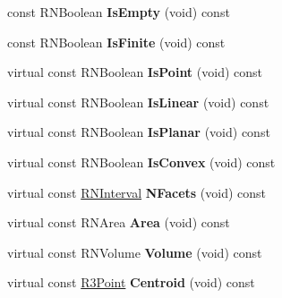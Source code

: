 \begin{DoxyCompactItemize}
\item 
const R\+N\+Boolean {\bfseries Is\+Empty} (void) const \hypertarget{class_r3_cylinder_a761d0c4aa5d83fc0affb7900b9805c8d}{}\label{class_r3_cylinder_a761d0c4aa5d83fc0affb7900b9805c8d}

\item 
const R\+N\+Boolean {\bfseries Is\+Finite} (void) const \hypertarget{class_r3_cylinder_a0280a087f4ffa522034a1ded3eeaad39}{}\label{class_r3_cylinder_a0280a087f4ffa522034a1ded3eeaad39}

\item 
virtual const R\+N\+Boolean {\bfseries Is\+Point} (void) const \hypertarget{class_r3_cylinder_a202a19364df59cbf2701c12f7ce8e13e}{}\label{class_r3_cylinder_a202a19364df59cbf2701c12f7ce8e13e}

\item 
virtual const R\+N\+Boolean {\bfseries Is\+Linear} (void) const \hypertarget{class_r3_cylinder_a05ee53382da321aa30bf2e61ccabbd49}{}\label{class_r3_cylinder_a05ee53382da321aa30bf2e61ccabbd49}

\item 
virtual const R\+N\+Boolean {\bfseries Is\+Planar} (void) const \hypertarget{class_r3_cylinder_a151f912edac18094583a02526a2198e6}{}\label{class_r3_cylinder_a151f912edac18094583a02526a2198e6}

\item 
virtual const R\+N\+Boolean {\bfseries Is\+Convex} (void) const \hypertarget{class_r3_cylinder_a15588c963e1b0d27483a700cc1cb5656}{}\label{class_r3_cylinder_a15588c963e1b0d27483a700cc1cb5656}

\item 
virtual const \hyperlink{class_r_n_interval}{R\+N\+Interval} {\bfseries N\+Facets} (void) const \hypertarget{class_r3_cylinder_a7d344fcfb80a822a767b77155b4d9399}{}\label{class_r3_cylinder_a7d344fcfb80a822a767b77155b4d9399}

\item 
virtual const R\+N\+Area {\bfseries Area} (void) const \hypertarget{class_r3_cylinder_a72b96706097f7c706290b62051df6b69}{}\label{class_r3_cylinder_a72b96706097f7c706290b62051df6b69}

\item 
virtual const R\+N\+Volume {\bfseries Volume} (void) const \hypertarget{class_r3_cylinder_a42968df3e8bdcb0a06bf8f5fe5e1987a}{}\label{class_r3_cylinder_a42968df3e8bdcb0a06bf8f5fe5e1987a}

\item 
virtual const \hyperlink{class_r3_point}{R3\+Point} {\bfseries Centroid} (void) const \hypertarget{class_r3_cylinder_aad3d64e44f52155c06114445dbf8a0c4}{}\label{class_r3_cylinder_aad3d64e44f52155c06114445dbf8a0c4}


\end{DoxyCompactItemize}
